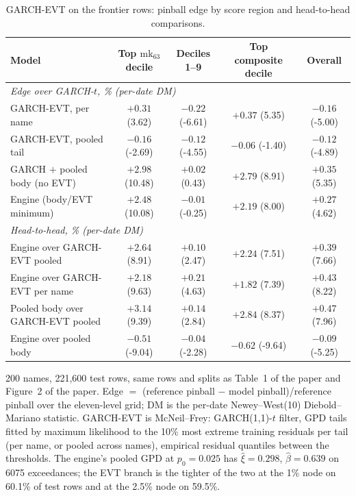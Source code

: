 \documentclass[11pt]{article}
\begin{document}
\begin{table}[htbp]
\centering
\begin{threeparttable}
\caption{GARCH-EVT on the frontier rows: pinball edge by score region and head-to-head comparisons.}
\label{tab:garchevt-frontier}
\small
\begin{tabular}{lcccc}
\toprule
Model & Top $\mathrm{mk}_{63}$ decile & Deciles 1--9 & Top composite decile & Overall \\
\midrule
\multicolumn{5}{l}{\emph{Edge over GARCH-$t$, \% (per-date DM)}} \\
GARCH-EVT, per name & $+0.31$ (3.62) & $-0.22$ (-6.61) & $+0.37$ (5.35) & $-0.16$ (-5.00) \\
GARCH-EVT, pooled tail & $-0.16$ (-2.69) & $-0.12$ (-4.55) & $-0.06$ (-1.40) & $-0.12$ (-4.89) \\
GARCH $+$ pooled body (no EVT) & $+2.98$ (10.48) & $+0.02$ (0.43) & $+2.79$ (8.91) & $+0.35$ (5.35) \\
Engine (body/EVT minimum) & $+2.48$ (10.08) & $-0.01$ (-0.25) & $+2.19$ (8.00) & $+0.27$ (4.62) \\
\midrule
\multicolumn{5}{l}{\emph{Head-to-head, \% (per-date DM)}} \\
Engine over GARCH-EVT pooled & $+2.64$ (8.91) & $+0.10$ (2.47) & $+2.24$ (7.51) & $+0.39$ (7.66) \\
Engine over GARCH-EVT per name & $+2.18$ (9.63) & $+0.21$ (4.63) & $+1.82$ (7.39) & $+0.43$ (8.22) \\
Pooled body over GARCH-EVT pooled & $+3.14$ (9.39) & $+0.14$ (2.84) & $+2.84$ (8.37) & $+0.47$ (7.96) \\
Engine over pooled body & $-0.51$ (-9.04) & $-0.04$ (-2.28) & $-0.62$ (-9.64) & $-0.09$ (-5.25) \\
\bottomrule
\end{tabular}
\begin{tablenotes}\footnotesize
\item 200 names, 221,600 test rows, same rows and splits as Table~1 of the paper and Figure~2 of the paper. Edge $=$ (reference pinball $-$ model pinball)/reference pinball over the eleven-level grid; DM is the per-date Newey--West(10) Diebold--Mariano statistic. GARCH-EVT is McNeil--Frey: GARCH(1,1)-$t$ filter, GPD tails fitted by maximum likelihood to the 10\% most extreme training residuals per tail (per name, or pooled across names), empirical residual quantiles between the thresholds. The engine's pooled GPD at $p_0=0.025$ has $\hat\xi=0.298$, $\hat\beta=0.639$ on 6075 exceedances; the EVT branch is the tighter of the two at the 1\% node on 60.1\% of test rows and at the 2.5\% node on 59.5\%.
\end{tablenotes}
\end{threeparttable}
\end{table}
\end{document}
